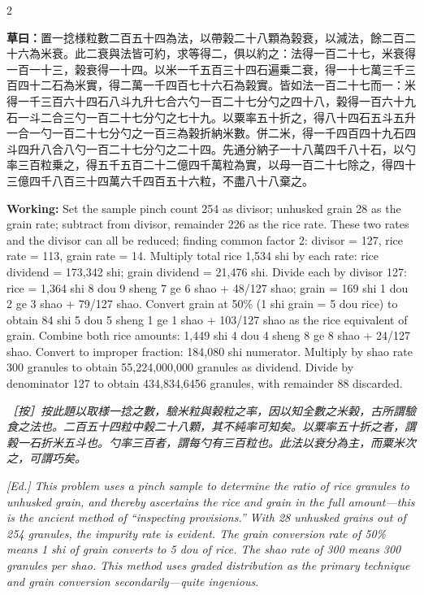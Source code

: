 \documentclass[11pt,a4paper]{article}
\newcommand{\WorkingText}[1]{\par\noindent\textbf{草曰：}#1\par}
\newcommand{\EdNoteText}[1]{\par\noindent\textit{\color{ednotecolor}［按］#1}\par}
\newcommand{\WorkingEn}[1]{\par\noindent\textbf{Working:} #1\par}
\newcommand{\EdNoteEn}[1]{\par\noindent\textit{\color{ednotecolor}[Ed.] #1}\par}
\begin{document}
\begin{paracol}{2}
\WorkingText{置一捻様粒數二百五十四為法，以帶榖二十八顆為榖衰，以減法，餘二百二十六為米衰。此二衰與法皆可約，求等得二，俱以約之：法得一百二十七，米衰得一百一十三，榖衰得一十四。以米一千五百三十四石遍乗二衰，得一十七萬三千三百四十二石為米實，得二萬一千四百七十六石為榖實。皆如法一百二十七而一：米得一千三百六十四石八斗九升七合六勺一百二十七分勺之四十八，榖得一百六十九石一斗二合三勺一百二十七分勺之七十九。以粟率五十折之，得八十四石五斗五升一合一勺一百二十七分勺之一百三為榖折納米數。併二米，得一千四百四十九石四斗四升八合八勺一百二十七分勺之二十四。先通分納子一十八萬四千八十石，以勺率三百粒乗之，得五千五百二十二億四千萬粒為實，以母一百二十七除之，得四十三億四千八百三十四萬六千四百五十六粒，不盡八十八棄之。}
\switchcolumn
\WorkingEn{Set the sample pinch count 254 as divisor; unhusked grain 28 as the grain rate; subtract from divisor, remainder 226 as the rice rate. These two rates and the divisor can all be reduced; finding common factor 2: divisor = 127, rice rate = 113, grain rate = 14. Multiply total rice 1,534 shi by each rate: rice dividend = 173,342 shi; grain dividend = 21,476 shi. Divide each by divisor 127: rice = 1,364 shi 8 dou 9 sheng 7 ge 6 shao + 48/127 shao; grain = 169 shi 1 dou 2 ge 3 shao + 79/127 shao. Convert grain at 50\% (1 shi grain = 5 dou rice) to obtain 84 shi 5 dou 5 sheng 1 ge 1 shao + 103/127 shao as the rice equivalent of grain. Combine both rice amounts: 1,449 shi 4 dou 4 sheng 8 ge 8 shao + 24/127 shao. Convert to improper fraction: 184,080 shi numerator. Multiply by shao rate 300 granules to obtain 55,224,000,000 granules as dividend. Divide by denominator 127 to obtain 434,834,6456 granules, with remainder 88 discarded.}
\switchcolumn*

\EdNoteText{按此題以取様一捻之數，驗米粒與榖粒之率，因以知全數之米榖，古所謂驗食之法也。二百五十四粒中榖二十八顆，其不純率可知矣。以粟率五十折之者，謂榖一石折米五斗也。勺率三百者，謂每勺有三百粒也。此法以衰分為主，而粟米次之，可謂巧矣。}
\switchcolumn
\EdNoteEn{This problem uses a pinch sample to determine the ratio of rice granules to unhusked grain, and thereby ascertains the rice and grain in the full amount---this is the ancient method of ``inspecting provisions.'' With 28 unhusked grains out of 254 granules, the impurity rate is evident. The grain conversion rate of 50\% means 1 shi of grain converts to 5 dou of rice. The shao rate of 300 means 300 granules per shao. This method uses graded distribution as the primary technique and grain conversion secondarily---quite ingenious.}

\end{paracol}
\end{document}
